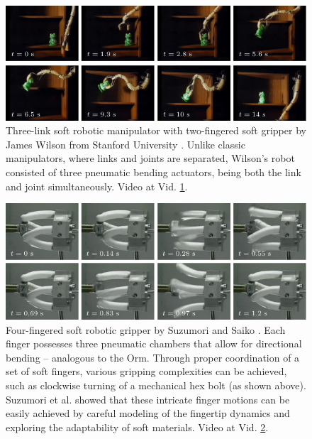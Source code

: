 \begin{figure}[!t]
  \vspace{-2mm}
  \centering
  \includegraphics*[width=\textwidth]{./pdf/thesis-figure-2-6.pdf}
  \caption{Three-link soft robotic manipulator with two-fingered soft gripper by James Wilson from Stanford University \cite{Wilson2007}. Unlike classic manipulators, where links and joints are separated, Wilson's robot consisted of three pneumatic bending actuators, being both the link and joint simultaneously. Video at Vid. \ref{fig:C0:fist_srm_robot}.
  \vspace{-1mm}
  \label{fig:C0:fist_srm_robot}}
\end{figure}

\begin{figure}[!t]
  \vspace{-0mm}
  \includegraphics*[width=\textwidth]{./pdf/thesis-figure-2-7.pdf}
  \caption{Four-fingered soft robotic gripper by Suzumori and Saiko \cite{Suzumori1991,Suzumori1992}. Each finger possesses three pneumatic chambers that allow for directional bending -- analogous to the Orm. Through proper coordination of a set of soft fingers, various gripping complexities can be achieved, such as clockwise turning of a mechanical hex bolt (as shown above). Suzumori et al. showed that these intricate finger motions can be easily achieved by careful modeling of the fingertip dynamics and exploring the adaptability of soft materials. Video at Vid. \ref{fig:C0:fist_grip_robot}.
  \label{fig:C0:fist_grip_robot}}
  \vspace{-3mm}
\end{figure}

